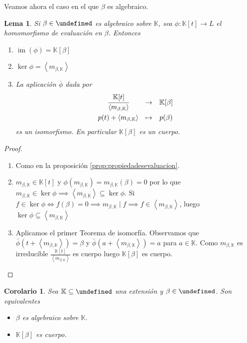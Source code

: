 \documentclass[10pt, spanish]{report}
\newtheorem{lema}[tma]{Lema}
\newtheorem{cor}{Corolario}[tma]
\theoremstyle{definition}
\theoremstyle{custom}
\theoremstyle{remark}
\newcommand{\K}{\mathbb{K}}
\let\L\undefined
\newcommand{\L}{\mathbb{L}}
\newcommand{\im}[1]{\operatorname{im}\left(#1\right)}
\begin{document}
Veamos ahora el caso en el que $\beta$ es algebraico.

\begin{lema}
    Si $\beta\in\L$ es algebraico sobre $\K$, sea $\phi:\K[t]\to L$ el
    homomorfismo de evaluación en $\beta$. Entonces
    \begin{enumerate}
        \item $\im{\phi}=\K[\beta]$
        \item $\ker{\phi}=\left<m_{\beta,\K}\right>$
        \item La aplicación $\overline{\phi}$ dada por
            \[\begin{matrix*}
                \cfrac{\K[t]}{\left<m_{\beta,\K}\right>}&\to&\K[\beta]\\[1em]
                p(t)+\left< m_{\beta,\K} \right>&\mapsto&p(\beta)
            \end{matrix*}\]
            es un isomorfismo. En particular $\K[\beta]$ es un cuerpo.
    \end{enumerate}
\end{lema}

\begin{proof}\hspace{0pt}
    \begin{enumerate}
        \item Como en la proposición \ref{prop:propiedadesevaluacion}.
        \item $m_{\beta,\K}\in\K[t]$ y $\phi(m_{\beta,\K})=m_{\beta,\K}(\beta)
            =0$ por lo que $m_{\beta,\K}\in \ker{\phi} \implies \left<
            m_{\beta,\K} \right> \subseteq \ker{\phi}$. Si $f\in\ker{\phi}
            \Leftrightarrow f(\beta)=0 \implies m_{\beta,\K}\mid f \implies f\in
            \left< m_{\beta,\K}\right> $, luego $\ker{\phi}\subseteq\left<
            m_{\beta,\K} \right> $
        \item Aplicamos el primer Teorema de isomorfía. Observamos que
            $\bar{\phi}(t+\left< m_{\beta,\K} \right>)=\beta$ y
            $\bar{\phi}(a+\left< m_{\beta,\K} \right>)=a$ para $a\in\K$. Como
            $m_{\beta,\K}$ es irreducible $\frac{\K[t]}{\left< m_{\beta,\K}
            \right> }$ es cuerpo luego $\K[\beta]$ es cuerpo.
    \end{enumerate}
    \vspace{-1.75em}
\end{proof}

\begin{cor}\label{cor:carcuerposelalg}
    Sea $\K\subseteq\L$ una extensión y $\beta\in \L$. Son equivalentes
    \begin{itemize}
        \item $\beta$ es algebraico sobre $\K$.
        \item $\K[\beta]$ es cuerpo.
    \end{itemize}
\end{cor}
\end{document}
